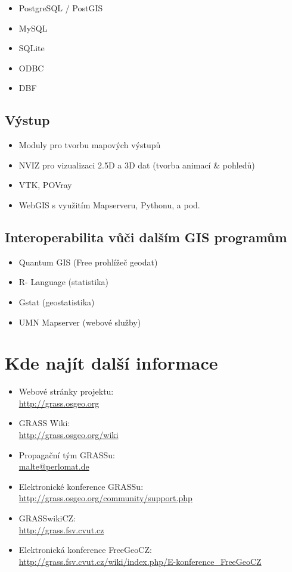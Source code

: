 \documentclass[notumble,a4paper,10pt,nofoldmark]{leaflet}
\newcommand{\GRASSurl}{\url{http://grass.osgeo.org}}
\begin{document}
\begin{itemize}
\item PostgreSQL / PostGIS
\item MySQL
\item SQLite
\item ODBC
\item DBF
\end{itemize}

\subsection{Výstup}

\begin{itemize}
\item Moduly pro tvorbu mapových výstupů
\item NVIZ pro vizualizaci 2.5D a 3D dat (tvorba animací \& pohledů)
\item VTK, POVray
\item WebGIS s využitím Mapserveru, Pythonu, a pod.
\end{itemize}

\subsection{Interoperabilita vůči dalším  GIS programům}

\begin{itemize}
\item Quantum GIS (Free prohlížeč geodat)
\item R- Language (statistika)
\item Gstat (geostatistika)
\item UMN Mapserver (webové služby)
\end{itemize}

\section{Kde najít další informace}

\begin{itemize}
\item{Webové stránky projektu: \\\GRASSurl}
\item{GRASS Wiki: \\\url{http://grass.osgeo.org/wiki}}
\item{Propagační tým GRASSu: \\\url{malte@perlomat.de}}
\item{Elektronické konference GRASSu:
    \\\url{http://grass.osgeo.org/community/support.php}}
\item{GRASSwikiCZ: \\\url{http://grass.fsv.cvut.cz}}
\item{Elektronická konference FreeGeoCZ: \\\url{http://grass.fsv.cvut.cz/wiki/index.php/E-konference_FreeGeoCZ}}
\end{itemize}
\end{document}
